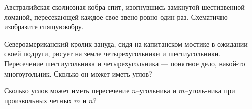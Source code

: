 ﻿

\begin{itemize}
 Австралийская сколиозная кобра спит, изогнувшись замкнутой шестизвенной ломаной, пересекающей каждое свое звено ровно один раз. Схематично изобразите спящую\linebreak кобру.

\itB Североамериканский кролик-зануда, сидя на капитанском мостике в ожидании своей подруги, рисует на земле четырехугольники и шестиугольники. Пересечение шестиугольника и четырехугольника — понятное дело, какой-то многоугольник. Сколько он может иметь углов?

\itC Сколько углов может иметь пересечение $n$--угольника и $m$--уголь-\linebreak ника при произвольных четных $m$ и $n$?
\end{itemize}